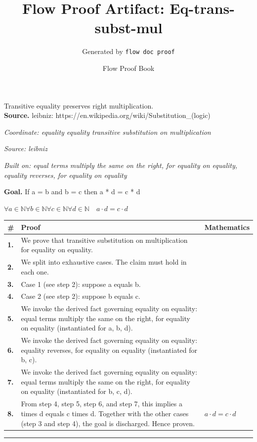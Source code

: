 \documentclass[11pt]{article}
\title{Flow Proof Artifact: Eq-trans-subst-mul}
\author{Generated by \texttt{flow doc proof}}
\date{Flow Proof Book}
\theoremstyle{definition}
\begin{document}
\maketitle
Transitive equality preserves right multiplication.\\[0.5em]
\textbf{Source.} leibniz: https://en.wikipedia.org/wiki/Substitution\_(logic)\\[0.5em]
\bigskip
{}\par
\smallskip\noindent\textit{Coordinate: equality \cdot equality \cdot transitive substitution on multiplication}\par
\smallskip\noindent\textit{Source: leibniz}\par
\smallskip\noindent\textit{Built on: equal terms multiply the same on the right, for equality on equality, equality reverses, for equality on equality}\par
\medskip
\noindent\textbf{Goal.} If a = b and b = c then a * d = c * d\par
\noindent$\displaystyle \forall a \in \mathbb{N} \forall b \in \mathbb{N} \forall c \in \mathbb{N} \forall d \in \mathbb{N}\quad a \cdot d = c \cdot d$\par
\medskip
\noindent
\begin{tabular}{@{} >{\raggedright\arraybackslash}p{} >{\raggedright\arraybackslash}p{} >{\raggedleft\arraybackslash}p{} @{}}
\textbf{\#} & \textbf{Proof} & \textbf{Mathematics} \\
\midrule
\textbf{1.} & We prove that transitive substitution on multiplication for equality on equality. & \\[0.45em]
\textbf{2.} & We split into exhaustive cases. The claim must hold in each one. & \\[0.45em]
\textbf{3.} & Case 1 (see step 2): suppose a  equals  b. & \\[0.45em]
\textbf{4.} & Case 2 (see step 2): suppose b  equals  c. & \\[0.45em]
\textbf{5.} & We invoke the derived fact governing equality on equality: equal terms multiply the same on the right, for equality on equality (instantiated for a, b, d). & \\[0.45em]
\textbf{6.} & We invoke the derived fact governing equality on equality: equality reverses, for equality on equality (instantiated for b, c). & \\[0.45em]
\textbf{7.} & We invoke the derived fact governing equality on equality: equal terms multiply the same on the right, for equality on equality (instantiated for b, c, d). & \\[0.45em]
\textbf{8.} & From step 4, step 5, step 6, and step 7, this implies a times d equals c times d. Together with the other cases (step 3 and step 4), the goal is discharged. Hence proven. & $\displaystyle a \cdot d = c \cdot d$ \\[0.45em]
\bottomrule
\end{tabular}
\label{thm:Eq-equality-transitive_substitution_on_multiplication}
\par\medskip\hrule
\end{document}
